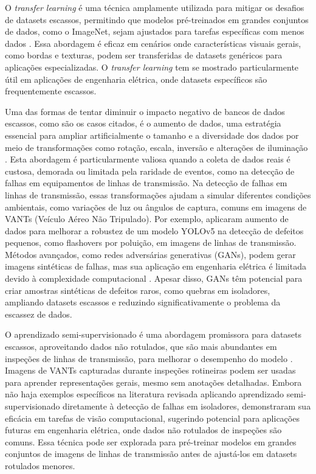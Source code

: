 O \textit{transfer learning} é uma técnica amplamente utilizada para mitigar os desafios de datasets escassos, permitindo que modelos pré-treinados em grandes conjuntos de dados, como o ImageNet, sejam ajustados para tarefas específicas com menos dados \cite{pan2010survey}. Essa abordagem é eficaz em cenários onde características visuais gerais, como bordas e texturas, podem ser transferidas de datasets genéricos para aplicações especializadas. O \textit{transfer learning} tem se mostrado particularmente útil em aplicações de engenharia elétrica, onde datasets específicos são frequentemente escassos.

Uma das formas de tentar diminuir o impacto negativo de bancos de dados escassos, como são os casos citados, é o aumento de dados, uma estratégia essencial para ampliar artificialmente o tamanho e a diversidade dos dados por meio de transformações como rotação, escala, inversão e alterações de iluminação \cite{shorten2019survey}. Esta abordagem é particularmente valiosa quando a coleta de dados reais é custosa, demorada ou limitada pela raridade de eventos, como na detecção de falhas em equipamentos de linhas de transmissão. Na detecção de falhas em linhas de transmissão, essas transformações ajudam a simular diferentes condições ambientais, como variações de luz ou ângulos de captura, comuns em imagens de VANTs (Veículo Aéreo Não Tripulado). Por exemplo,  aplicaram aumento de dados para melhorar a robustez de um modelo YOLOv5 na detecção de defeitos pequenos, como flashovers por poluição, em imagens de linhas de transmissão. Métodos avançados, como redes adversárias generativas (GANs), podem gerar imagens sintéticas de falhas, mas sua aplicação em engenharia elétrica é limitada devido à complexidade computacional \cite{goodfellow2014generative}. Apesar disso, GANs têm potencial para criar amostras sintéticas de defeitos raros, como quebras em isoladores, ampliando datasets escassos e reduzindo significativamente o problema da escassez de dados.

O aprendizado semi-supervisionado é uma abordagem promissora para datasets escassos, aproveitando dados não rotulados, que são mais abundantes em inspeções de linhas de transmissão, para melhorar o desempenho do modelo \cite{van2020survey}. Imagens de VANTs capturadas durante inspeções rotineiras podem ser usadas para aprender representações gerais, mesmo sem anotações detalhadas. Embora não haja exemplos específicos na literatura revisada aplicando aprendizado semi-supervisionado diretamente à detecção de falhas em isoladores,  demonstraram sua eficácia em tarefas de visão computacional, sugerindo potencial para aplicações futuras em engenharia elétrica, onde dados não rotulados de inspeções são comuns. Essa técnica pode ser explorada para pré-treinar modelos em grandes conjuntos de imagens de linhas de transmissão antes de ajustá-los em datasets rotulados menores.

